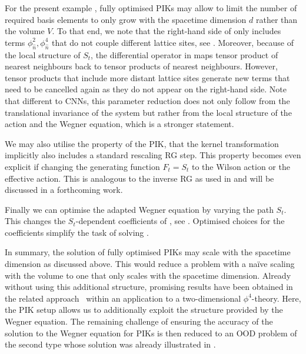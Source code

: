 \documentclass[reprint,amsmath,amssymb,aps,pra,superscriptaddress,nofootinbib,twocolumn,floatfix,nolongbibliography]{revtex4-2}
\begin{document}
For the present example , fully optimised PIKs may allow to limit the number of required basis elements to only grow with the spacetime dimension $d$ rather than the volume $V$. To that end, we note that the right-hand side of  only includes terms $\phi_{\hat{n}}^2, \phi_{\hat{n}}^4$ that do not couple different lattice sites, see . Moreover, because of the local structure of $S_t$, the differential operator in  maps tensor product of nearest neighbours back to tensor products of nearest neighbours. However, tensor products that include more distant lattice sites generate new terms that need to be cancelled again as they do not appear on the right-hand side. Note that different to CNNs, this parameter reduction does not only follow from the translational invariance of the system but rather from the local structure of the action and the Wegner equation, which is a stronger statement.

We may also utilise the property of the PIK, that the kernel transformation implicitly also includes a standard rescaling RG step. This property becomes even explicit if changing the generating function $F_t=S_t$ to the Wilson action or the effective action. This is analogous to the inverse RG as used in \cite{Bauer:2024byr,Bachtis:2021eww,Efthymiou:2019qnc,Singha:2025mgs,Masuki:2025irg} and will be discussed in a forthcoming work.

Finally we can optimise the adapted Wegner equation  by varying  the path $S_t$. This changes the $S_t$-dependent coefficients of , see . Optimised choices for the coefficients simplify the task of solving . 

In summary, the solution of fully optimised PIKs may scale with the spacetime dimension as discussed above. This would reduce a problem with a na\"ive scaling with the volume to one that only scales with the spacetime dimension. Already without using this additional structure, promising results have been obtained in the related approach~\cite{Albergo:2025nets} within an application to a two-dimensional $\phi^4$-theory. Here, the PIK setup allows us to additionally exploit the structure provided by the Wegner equation. The remaining challenge of ensuring the accuracy of the solution to the Wegner equation for PIKs is then reduced to an OOD problem of the second type whose solution was already illustrated in . 
\end{document}
